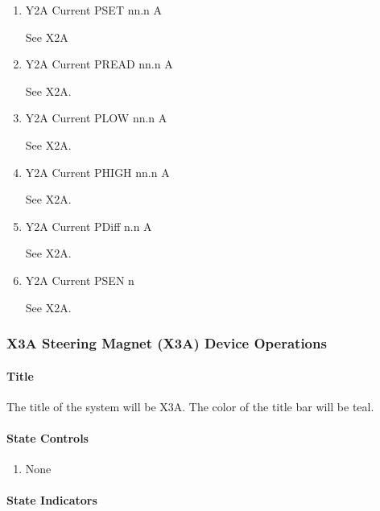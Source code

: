 \documentclass[11pt]{book}		%
\begin{document}
\begin{enumerate}
 \item Y2A Current PSET   nn.n A

\color{red}
See X2A
\color{black}

 \item Y2A Current PREAD  nn.n A

\color{red}
See X2A.
\color{black}

 \item Y2A Current PLOW   nn.n A

\color{red}
See X2A.
\color{black}

 \item Y2A Current PHIGH  nn.n A

\color{red}
See X2A.
\color{black}

 \item Y2A Current PDiff n.n A

\color{red}
See X2A.
\color{black}

 \item Y2A Current PSEN  n

\color{red}
See X2A.
\color{black}

\end{enumerate}

\subsubsection{X3A Steering Magnet (X3A) Device Operations} \label{sect:cyc-op-interface-ops-terminal-device-ops-x3a}

\paragraph{Title} \label{sect:cyc-op-interface-ops-terminal-device-ops-x3a-title}

The title of the system will be X3A.  The color of the title bar will be teal.

\paragraph{State Controls}

\begin{enumerate}
\item None
\end{enumerate}

\paragraph{State Indicators}
\end{document}
